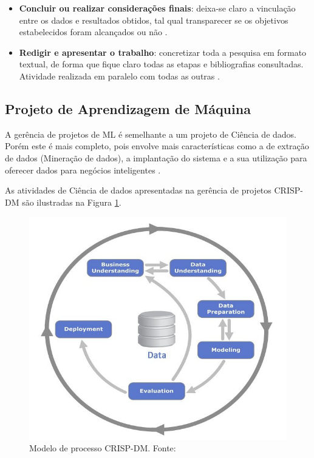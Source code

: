\begin{itemize}
  \item \textbf{Concluir ou realizar considerações finais}: deixa-se claro a vinculação entre os dados e resultados obtidos, tal qual transparecer se os objetivos estabelecidos foram alcançados ou não \cite{GIL2002}.
  \item \textbf{Redigir e apresentar o trabalho}: concretizar toda a pesquisa em formato textual, de forma que fique claro todas as etapas e bibliografias consultadas. Atividade realizada em paralelo com todas as outras \cite{PRODANOV2013}.
\end{itemize}

\subsection{Projeto de Aprendizagem de Máquina} \label{sec:projetoML}

A gerência de projetos de ML é semelhante a um projeto de Ciência de dados. Porém este é mais completo, pois envolve mais características como a de extração de dados (Mineração de dados), a implantação do sistema e a sua utilização para oferecer dados para negócios inteligentes \cite{CHAPMAN2000}.

As atividades de Ciência de dados apresentadas na gerência de projetos CRISP-DM são ilustradas na Figura \ref{fig:crispdmProcess}.

\begin{figure}[h]
	\centering
    \includegraphics[keepaspectratio=true,scale=0.5]{figuras/crispdmProcess}
	\caption[Modelo de processo CRISP-DM]{Modelo de processo CRISP-DM. Fonte: \cite[Página 10]{CHAPMAN2000}}
    \label{fig:crispdmProcess}
\end{figure}

